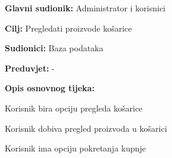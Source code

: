 					\noindent {}
					\begin{packed_item}
						
						\item \textbf{Glavni sudionik: }Administrator i korisnici
						\item  \textbf{Cilj:} Pregledati proizvode košarice
						\item  \textbf{Sudionici:} Baza podataka
						\item  \textbf{Preduvjet:} -
						\item  \textbf{Opis osnovnog tijeka:}
						
						\item[] \begin{packed_enum}
							
							\item Korisnik bira opciju pregleda košarice
							\item Korisnik dobiva pregled proizvoda u košarici
							\item Korisnik ima opciju pokretanja kupnje 
						\end{packed_enum}
						
					\end{packed_item}
				
